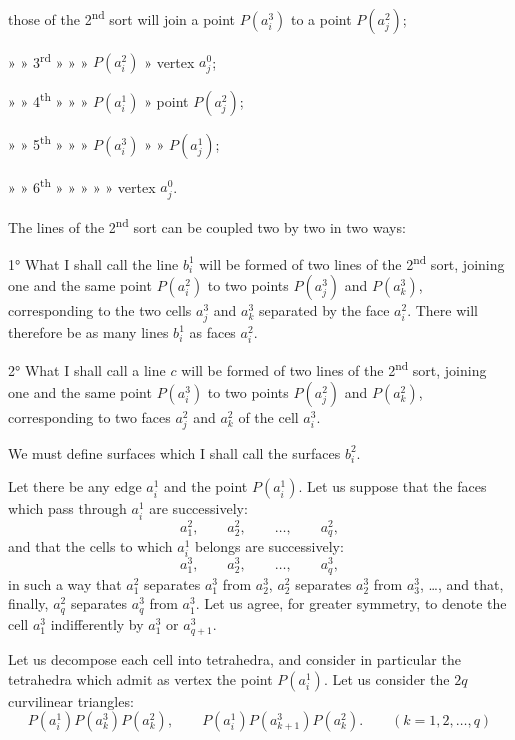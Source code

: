 \documentclass{article}
\begin{document}
those of the 2\textsuperscript{nd} sort will join a point $P(a^{3}_{i})$ to a point $P(a^{2}_{j})$;

» » 3\textsuperscript{rd} » » » $P(a^{2}_{i})$ » vertex $a^{0}_{j}$;

» » 4\textsuperscript{th} » » » $P(a^{1}_{i})$ » point $P(a^{2}_{j})$;

» » 5\textsuperscript{th} » » » $P(a^{3}_{i})$ » » $P(a^{1}_{j})$;

» » 6\textsuperscript{th} » » » » » vertex $a^{0}_{j}$.

The lines of the 2\textsuperscript{nd} sort can be coupled two by two in two ways:

1° What I shall call the line $b^{1}_{i}$ will be formed of two lines of the 2\textsuperscript{nd} sort, joining one and the same point $P(a^{2}_{i})$ to two points $P(a^{3}_{j})$ and $P(a^{3}_{k})$, corresponding to the two cells $a^{3}_{j}$ and $a^{3}_{k}$ separated by the face $a^{2}_{i}$. There will therefore be as many lines $b^{1}_{i}$ as faces $a^{2}_{i}$.

2° What I shall call a line $c$ will be formed of two lines of the 2\textsuperscript{nd} sort, joining one and the same point $P(a^{3}_{i})$ to two points $P(a^{2}_{j})$ and $P(a^{2}_{k})$, corresponding to two faces $a^{2}_{j}$ and $a^{2}_{k}$ of the cell $a^{3}_{i}$.

We must define surfaces which I shall call the surfaces $b^{2}_{i}$.

Let there be any edge $a^{1}_{i}$ and the point $P(a^{1}_{i})$. Let us suppose that the faces which pass through $a^{1}_{i}$ are successively:
\[ a^{2}_{1}, \qquad a^{2}_{2}, \qquad \ldots, \qquad a^{2}_{q}, \]
and that the cells to which $a^{1}_{i}$ belongs are successively:
\[ a^{3}_{1}, \qquad a^{3}_{2}, \qquad \ldots, \qquad a^{3}_{q}, \]
in such a way that $a^{2}_{1}$ separates $a^{3}_{1}$ from $a^{3}_{2}$, $a^{2}_{2}$ separates $a^{3}_{2}$ from $a^{3}_{3}$, \ldots, and that, finally, $a^{2}_{q}$ separates $a^{3}_{q}$ from $a^{3}_{1}$. Let us agree, for greater symmetry, to denote the cell $a^{3}_{1}$ indifferently by $a^{3}_{1}$ or $a^{3}_{q+1}$.

Let us decompose each cell into tetrahedra, and consider in particular the tetrahedra which admit as vertex the point $P(a^{1}_{i})$. Let us consider the $2q$ curvilinear triangles:
\[ P(a^{1}_{i}) P(a^{3}_{k}) P(a^{2}_{k}), \qquad P(a^{1}_{i}) P(a^{3}_{k+1}) P(a^{2}_{k}). \qquad (k = 1, 2, \ldots, q) \]

\end{document}

